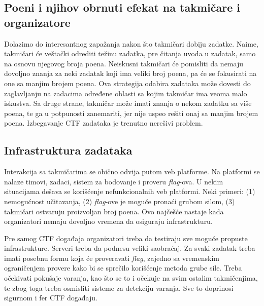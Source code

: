 \documentclass[12pt, a4paper, twocolumn]{article}
\begin{document}
\subsection{Poeni i njihov obrnuti efekat na takmičare i organizatore}

Dolazimo do interesantnog zapažanja nakon što takmičari dobiju zadatke.
Naime, takmičari će veštački odrediti težinu zadatka, pre čitanja uvoda u 
zadatak, samo na osnovu njegovog broja poena. Neiskusni takmičari će pomisliti
da nemaju dovoljno znanja za neki zadatak koji ima veliki broj poena, pa
će se fokusirati na one sa manjim brojem poena. Ova strategija odabira 
zadataka može dovesti do zaglavljanju na zadacima određene oblasti sa kojim
takmičar ima veoma malo iskustva. Sa druge strane, takmičar može imati
znanja o nekom zadatku sa više poena, te ga u potpunosti zanemariti, jer
nije uspeo rešiti onaj sa manjim brojem poena. Izbegavanje CTF zadataka
je trenutno nerešivi problem.

\subsection{Infrastruktura zadataka}

Interakcija sa takmičarima se obično odvija putom veb platforme. Na platformi 
se nalaze timovi, zadaci, sistem za bodovanje i proveru \emph{flag}-ova. U 
nekim situacijama dešava se korišćenje nefunkcionalnih veb platformi. Neki 
primeri: (1) nemogućnost učitavanja, (2) \emph{flag}-ove je moguće pronaći 
grubom silom, (3) takmičari ostvaruju proizvoljan broj poena. Ovo najčešće 
nastaje kada organizatori nemaju dovoljno vremena da osiguraju infrastrukturu.

Pre samog CTF događaja organizatori treba da testiraju sve moguće
propuste infrastrukture. Serveri treba da podnesu veliki saobraćaj.
Za svaki zadatak treba imati posebnu formu koja će proveravati \emph{flag},
zajedno sa vremenskim ograničenjem provere kako bi se sprečilo korišćenje
metoda grube sile. Treba očekivati pokušaje varanja, kao što se to i očekuje 
na svim ostalim takmičenjima, te zbog toga treba osmisliti sisteme za 
detekciju varanja. Sve to doprinosi sigurnom i fer CTF događaju.
\end{document}
